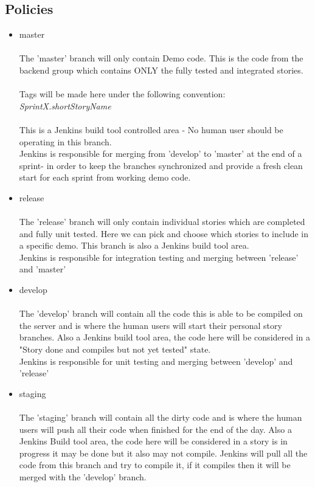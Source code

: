\subsection {Policies}
\begin{itemize}
\item master\\ \\
The 'master' branch will only contain Demo code. This is the code from the backend group which contains ONLY the fully tested and integrated stories.  \\\\Tags will be made here under the following convention:\\ \emph{SprintX.shortStoryName} \\\\
This is a Jenkins build tool controlled area - No human user should be operating in this branch. \\Jenkins is responsible for  merging from 'develop' to 'master' at the end of a sprint- in order to keep the branches synchronized and provide a fresh clean start for each sprint from working demo code.\\
\item release\\ \\
The 'release' branch will only contain individual stories which are completed and fully unit tested. Here we can pick and choose which stories to include in a specific demo. This branch is also a Jenkins build tool area. \\Jenkins is responsible for integration testing and merging between 'release' and 'master'
\item develop\\ \\
The 'develop' branch will contain all the code this is able to be compiled on the server and is where the human users will start their personal story branches. Also a Jenkins build tool area, the code here will be considered in a "Story done and compiles but not yet tested" state.\\ Jenkins is responsible for unit testing and merging between 'develop' and 'release'

\item staging \\ \\
The 'staging' branch will contain all the dirty code and is where the human users will push all their code when finished for the end of the day. Also a Jenkins Build tool area, the code here will be considered in a story is in progress it may be done but it also may not compile. Jenkins will pull all the code from this branch and try to compile it, if it compiles then it will be merged with the 'develop' branch.


\end{itemize}
